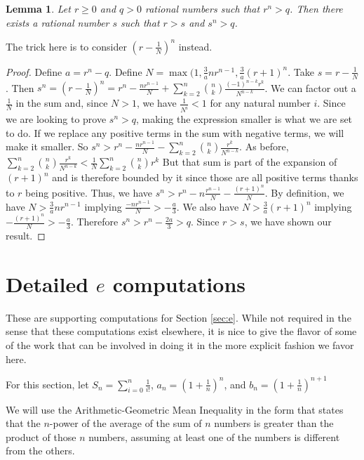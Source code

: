 \documentclass[12pt]{article}
\newtheorem{lemma}{Lemma}[subsection]
\theoremstyle{remark}
\begin{document}
\begin{lemma}\label{app:greater}
Let $r \geq 0 $ and $q > 0$ rational numbers such that $r^n > q$. Then there exists a rational number $s$ such that $r > s$ and $s^n > q$.
\end{lemma}

The trick here is to consider $(r-\tfrac{1}{N})^n$ instead. 

\begin{proof}
Define $a = r^n - q$. Define $N =  \max(1,\tfrac{3}{a}n r^{n-1}, \tfrac{3}{a}(r+1)^n$.  Take $s = r - \tfrac{1}{N}$. Then $s^n = (r- \tfrac{1}{N})^n = r^n - \tfrac{n r^{n-1}}{N} + \sum_{k=2}^{n} \binom{n}{k} \tfrac{ (-1)^{n-k} r^k}{N^{n-k}}$. We can factor out a $\tfrac{1}{N}$ in the sum and, since $N > 1$, we have $\tfrac{1}{N^i} < 1$ for any natural number $i$. Since we are looking to prove $s^n > q$, making the expression smaller is what we are set to do. If we replace any positive terms in the sum with negative terms, we will make it smaller. So $s^n > r^n - \tfrac{n r^{n-1}}{N} - \sum_{k=2}^{n} \binom{n}{k} \tfrac{r^k}{N^{n-k}}$. As before, $\sum_{k=2}^{n} \binom{n}{k} \tfrac{r^k}{N^{n-k}} < \tfrac{1}{N} \sum_{k=2}^{n} \binom{n}{k} r^k$  But that sum is part of the expansion of $(r+1)^n$ and is therefore bounded by it since those are all positive terms thanks to $r$ being positive. Thus, we have $s^n > r^n - n \tfrac{r^{n-1}}{N} - \tfrac{ (r+1)^n }{N}$.  By definition, we have $N > \tfrac{3}{a} n r^{n-1}$ implying $ \tfrac{-n r^{n-1}}{N} > -\tfrac{a}{3}$. We also have $N > \tfrac{3}{a} (r+1)^n$ implying $ -\tfrac{(r+1)^n}{N} > -\tfrac{a}{3}$. Therefore $s^n > r^n - \tfrac{2 a}{3} > q$. Since $r>s$, we have shown our result. 
\end{proof}

\section{Detailed $e$ computations}\label{app:e}

These are supporting computations for Section \ref{sec:e}. While not required in the sense that these computations exist elsewhere, it is nice to give the flavor of some of the work that can be involved in doing it in the more explicit fashion we favor here. 

For this section, let $S_n = \sum_{i=0}^n \frac{1}{i!}$, $a_n = (1+\frac{1}{n})^{n}  $, and $b_n = (1+\frac{1}{n})^{n+1}$

We will use the Arithmetic-Geometric Mean Inequality in the form that states that the $n$-power of the average of the sum of $n$ numbers is greater than the product of those $n$ numbers, assuming at least one of the numbers is different from the others. 
\end{document}
